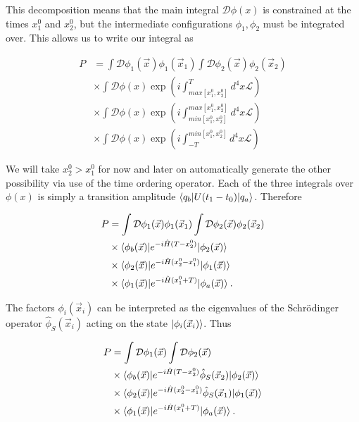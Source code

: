 This decomposition means that the main integral $\mathcal{D} \phi(x)$ is constrained at the times $x_1^0$ and $x_2^0$, but the intermediate configurations $\phi_1, \phi_2$ must be integrated over. This allows us to write our integral as

\begin{equation}
\begin{split}
P &= \int \mathcal{D} \phi_1(\vec{x}) \phi_1(\vec{x}_1) \int \mathcal{D} \phi_2(\vec{x}) \phi_2(\vec{x}_2) \\
&\times  \int \mathcal{D} \phi(x) \exp \left(i \int_{max[x_1^0, x_2^0]}^T d^4 x \mathscr{L}\right) \\
& \times \int \mathcal{D} \phi(x) \exp \left(i \int_{min [x_1^0, x_2^0]}^{max[x_1^0, x_2^0]} d^4 x \mathscr{L}\right) \\
& \times \int \mathcal{D} \phi(x) \exp \left(i \int_{-T}^{min [x_1^0, x_2^0]} d^4 x \mathscr{L}\right)
\end{split}
\end{equation}

We will take $x_2^0 > x_1^0$ for now and later on automatically generate the other possibility via use of the time ordering operator. Each of the three integrals over $\phi(x)$ is simply a transition amplitude $\mathinner{\langle q_b\vert U(t_1 - t_0)\vert q_a\rangle}_{}$. Therefore

\begin{equation}
\begin{split}
P &= \int \mathcal{D} \phi_1(\vec{x}) \phi_1(\vec{x}_1) \int \mathcal{D} \phi_2(\vec{x}) \phi_2(\vec{x}_2) \\
& \times \mathinner{\langle\phi_b(\vec{x})\vert e^{-i \hat{H} (T - x_2^0)}\vert\phi_2(\vec{x})\rangle}_{} \\
& \times \mathinner{\langle\phi_2(\vec{x})\vert e^{-i \hat{H} (x_2^0 - x_1^0)}\vert\phi_1(\vec{x})\rangle}_{} \\
&\times \mathinner{\langle\phi_1(\vec{x})\vert e^{-i \hat{H} (x_1^0+T)}\vert\phi_a(\vec{x})\rangle}_{}. 
\end{split}
\end{equation}

The factors $\phi_i (\vec{x}_i)$ can be interpreted as the eigenvalues of the Schr\"odinger operator $\hat{\phi}_S (\vec{x}_i)$ acting on the state $\mathinner{\lvert\phi_i(\vec{x}_i)\rangle}_{\hspace{-0.1em}}$. Thus

\begin{equation}
\begin{split}
P &= \int \mathcal{D} \phi_1(\vec{x}) \int \mathcal{D} \phi_2(\vec{x})  \\
& \times \mathinner{\langle\phi_b(\vec{x})\vert e^{-i \hat{H} (T - x_2^0)} \hat{\phi}_S (\vec{x}_2)\vert\phi_2(\vec{x})\rangle}_{} \\
& \times \mathinner{\langle\phi_2(\vec{x})\vert e^{-i \hat{H} (x_2^0 - x_1^0)} \hat{\phi}_S (\vec{x}_1)\vert\phi_1(\vec{x})\rangle}_{} \\
&\times \mathinner{\langle\phi_1(\vec{x})\vert e^{-i \hat{H} (x_1^0+T)}\vert\phi_a(\vec{x})\rangle}_{}.
\end{split}
\end{equation}

